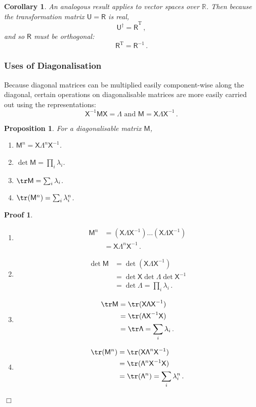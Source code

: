 \documentclass{article}
\theoremstyle{plain}\theoremheaderfont{\normalfont\itshape}\theorembodyfont{\rmfamily}\theoremseparator{.}\newtheorem*{rem}{Remark}\newtheorem*{ex}{Example}\newtheorem*{proof}{Proof}\newtheorem*{altp}{Alternative proof}
\theoremstyle{plain}\theoremheaderfont{\normalfont\bfseries}\theorembodyfont{\rmfamily}\theoremseparator{.}\newtheorem{thm}{Theorem}[section]\newtheorem{lem}[thm]{Lemma}\newtheorem{prop}[thm]{Proposition}\newtheorem*{cor}{Corollary}\newtheorem{defn}[thm]{Definition}\newtheorem{clm}[thm]{Claim}\newtheorem{clminproof}{Claim}
\theoremstyle{break}\theoremheaderfont{\normalfont\itshape}\theorembodyfont{\rmfamily}\theoremseparator{.\medskip}\newtheorem*{proofskip}{Proof}\newtheorem*{exs}{Examples}\newtheorem*{rems}{Remarks}
\theoremstyle{break}\theoremheaderfont{\normalfont\bfseries}\theorembodyfont{\rmfamily}\theoremseparator{.\medskip}\newtheorem{lemskip}[thm]{Lemma}\newtheorem{defnskip}[thm]{Definition}\newtheorem{propskip}[thm]{Proposition}\newtheorem{thmskip}[thm]{Theorem}
\numberwithin{equation}{section}
\newcommand{\qed}{\hfill\ensuremath{\Box}}
\newcommand{\tp}{^\mathrm{T}}
\begin{document}
	\begin{cor}
		An analogous result applies to vector spaces over \(\mathbb{R}\). Then because the transformation matrix \(\mathsf{U=R}\) is real,
		\[\mathsf{U^\dagger=R}^{\mathrm{T}}\,,\]
		and so \(\mathsf{R}\) must be orthogonal:
		\[\mathsf{R}\tp=\mathsf{R}^{-1}\,.\]
	\end{cor}
	\subsubsection{Uses of Diagonalisation}
	Because diagonal matrices can be multiplied easily component-wise along the diagonal, certain operations on diagonalisable matrices are more easily carried out using the representations:
	\[\mathsf{X}^{-1}\mathsf{MX=\Lambda}\text{ and }\mathsf{M=X\Lambda X}^{-1}\,.\]
	
	\begin{prop}
		For a diagonalisable matrix \(\mathsf{M}\),
		\begin{enumerate}[topsep=0pt]
			\item \(\mathsf{M}^n=\mathsf{X\Lambda}^n\mathsf{X}^{-1}\).
			\item \(\det\mathsf{M}=\prod_{i}\lambda_i\).
			\item \(\tr\mathsf{M}=\sum_{i}\lambda_i\).
			\item \(\tr(\mathsf{M}^n)=\sum_{i}\lambda_i^n\).
		\end{enumerate}
	\end{prop}
	\begin{proofskip}
		\begin{enumerate}[topsep=0pt]
			\item \begin{align*}
				\mathsf{M}^n&=(\mathsf{X\Lambda X}^{-1})\dots(\mathsf{X\Lambda X}^{-1})\\
				&=\mathsf{X\Lambda}^n\mathsf{X}^{-1}\,.
			\end{align*}
			\item \begin{align*}
				\det \mathsf{M}&=\det(\mathsf{X\Lambda X}^{-1})\\
				&=\det\mathsf{X}\det\mathsf{\Lambda}\det\mathsf{X}^{-1}\\
				&=\det\mathsf{\Lambda}=\prod_{i}\lambda_i\,.
			\end{align*}
			\item \begin{align*}
				\tr\mathsf{M}&=\tr(\mathsf{X\Lambda X}^{-1})\\
				&=\tr(\mathsf{\Lambda X}^{-1}\mathsf{X})\\
				&=\tr\mathsf{\Lambda}=\sum_{i}\lambda_i\,.
			\end{align*}
			\item \begin{align*}
				\tr(\mathsf{M}^n)&=\tr(\mathsf{X\Lambda}^n\mathsf{X}^{-1})\\
				&=\tr(\mathsf{\Lambda}^n\mathsf{X}^{-1}\mathsf{X})\\
				&=\tr(\mathsf{\Lambda}^n)=\sum_{i}\lambda_i^n\,.
			\end{align*}
		\end{enumerate}\qed
	\end{proofskip}
	
\end{document}
